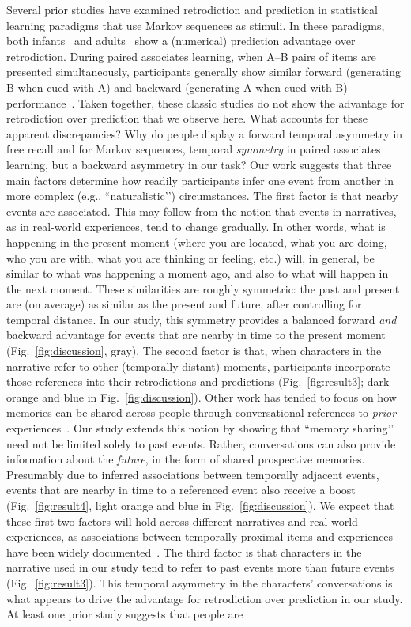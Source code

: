 \documentclass[10pt]{article}
\begin{document}
Several prior studies have examined retrodiction and prediction in statistical learning paradigms that use Markov sequences as stimuli.  In these paradigms, both infants~\citep{TummEtal16} and adults~\citep{JonePash07} show a (numerical) prediction advantage over retrodiction.  During paired associates learning, when A–B pairs of items are presented simultaneously, participants generally show similar forward (generating B when cued with A) and backward (generating A when cued with B) performance~\citep{AschEben62, Kaha02}.  Taken together, these classic studies do not show the advantage for retrodiction over prediction that we observe here.  What accounts for these apparent discrepancies?  Why do people display a forward temporal asymmetry in free recall and for Markov sequences, temporal \textit{symmetry} in paired associates learning, but a backward asymmetry in our task?  Our work suggests that three main factors determine how readily participants infer one event from another in more complex (e.g., ``naturalistic’’) circumstances.  The first factor is that nearby events are associated.  This may follow from the notion that events in narratives, as in real-world experiences, tend to change gradually.  In other words, what is happening in the present moment (where you are located, what you are doing, who you are with, what you are thinking or feeling, etc.) will, in general, be similar to what was happening a moment ago, and also to what will happen in the next moment.  These similarities are roughly symmetric: the past and present are (on average) as similar as the present and future, after controlling for temporal distance.  In our study, this symmetry provides a balanced forward \textit{and} backward advantage for events that are nearby in time to the present moment (Fig.~\ref{fig:discussion}, gray).  The second factor is that, when characters in the narrative refer to other (temporally distant) moments, participants incorporate those references into their retrodictions and predictions (Fig.~\ref{fig:result3}; dark orange and blue in Fig.~\ref{fig:discussion}).  Other work has tended to focus on how memories can be shared across people through conversational references to \textit{prior} experiences~\citep{HirsEcht12, MahrCsib18, Dess07}.  Our study extends this notion by showing that ``memory sharing’’ need not be limited solely to past events.  Rather, conversations can also provide information about the \textit{future}, in the form of shared prospective memories.  Presumably due to inferred associations between temporally adjacent events, events that are nearby in time to a referenced event also receive a boost (Fig.~\ref{fig:result4}, light orange and blue in Fig.~\ref{fig:discussion}).  We expect that these first two factors will hold across different narratives and real-world experiences, as associations between temporally proximal items and experiences have been widely documented~\citep[for review, see][]{KahaEtal22, Mann20}.  The third factor is that characters in the narrative used in our study tend to refer to past events more than future events (Fig.~\ref{fig:result3}).  This temporal asymmetry in the characters’ conversations is what appears to drive the advantage for retrodiction over prediction in our study.  At least one prior study suggests that people are 
\end{document}
